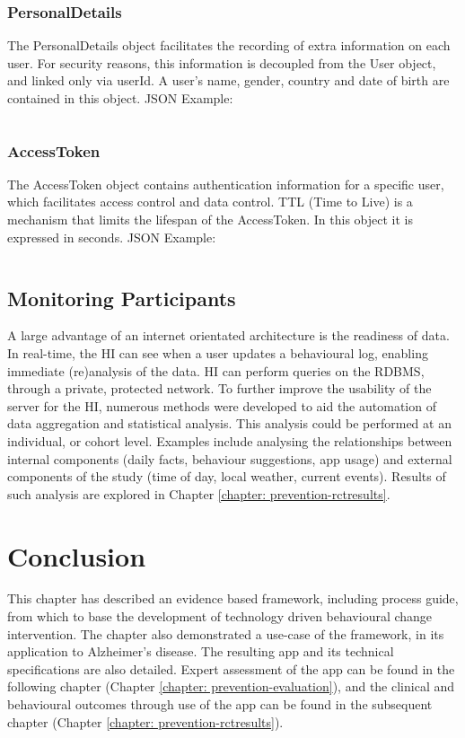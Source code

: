 \subsubsection{PersonalDetails}
The PersonalDetails object facilitates the recording of extra information on each user. For security reasons, this information is decoupled from the User object, and linked only via userId. A user's name, gender, country and date of birth are contained in this object. JSON Example: \inputminted{json}{Files/prevention-study-1/code/personaldetails.json}

\subsubsection{AccessToken}
The AccessToken object contains authentication information for a specific user, which facilitates  access control and data control. TTL (Time to Live) is a mechanism that limits the lifespan of the AccessToken. In this object it is expressed in seconds. JSON Example: \inputminted{json}{Files/prevention-study-1/code/accesstoken.json}

\subsection{Monitoring Participants}
A large advantage of an internet orientated architecture is the readiness of data. In real-time, the HI can see when a user updates a behavioural log, enabling immediate (re)analysis of the data. HI can perform queries on the RDBMS, through a private, protected network. To further improve the usability of the server for the HI, numerous methods were developed to aid the automation of data aggregation and statistical analysis. This analysis could be performed at an individual, or cohort level.
Examples include analysing the relationships between internal components (daily facts, behaviour suggestions, app usage) and external components of the study (time of day, local weather, current events). Results of such analysis are explored in Chapter \ref{chapter: prevention-rctresults}.

\section{Conclusion}
This chapter has described an evidence based framework, including process guide, from which to base the development of technology driven behavioural change intervention. The chapter also demonstrated a use-case of the framework, in its application to Alzheimer's disease. The resulting app and its technical specifications are also detailed. Expert assessment of the app can be found in the following chapter (Chapter \ref{chapter: prevention-evaluation}), and the clinical and behavioural outcomes through use of the app can be found in the subsequent chapter (Chapter \ref{chapter: prevention-rctresults}).
